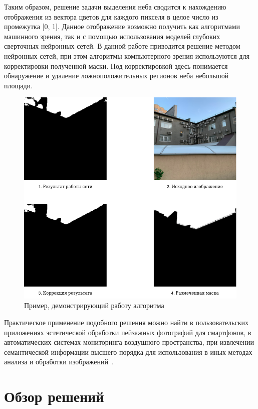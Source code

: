 Таким образом, решение задачи выделения неба сводится к нахождению отображения из вектора цветов для каждого пикселя в целое число из промежутка [0, 1].
Данное отображение возможно получить как алгоритмами машинного зрения, так и с помощью использования моделей глубоких сверточных нейронных сетей.
В данной работе приводится решение методом нейронных сетей, при этом алгоритмы компьютерного зрения используются для корректировки полученной маски.
Под корректировкой здесь понимается обнаружение и удаление ложноположительных регионов неба небольшой площади.

\begin{figure}[H]
    \centering
    \includegraphics[width=\textwidth]{img/sky_segmentation.png}
    \caption{Пример, демонстрирующий работу алгоритма}
    \label{fig:sky_seg}
\end{figure}

Практическое применение подобного решения можно найти в пользовательских приложениях эстетической обработки пейзажных фотографий для смартфонов,
в автоматических системах мониторинга воздушного пространства, при извлечении семантической информации высшего порядка для использования в иных методах анализа
и обработки изображений~\autocite{7415405}.

\section{Обзор решений}

